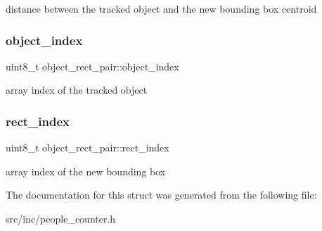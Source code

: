 distance between the tracked object and the new bounding box centroid \mbox{\label{structobject__rect__pair_a6e1fad724b69c75cb7702a545c1b8715}} 
\subsubsection{\texorpdfstring{object\_index}{object\_index}}
{\footnotesize\ttfamily uint8\+\_\+t object\+\_\+rect\+\_\+pair\+::object\+\_\+index}

array index of the tracked object \mbox{\label{structobject__rect__pair_ac89984c58c0f4309ff2a5cb75a6bc18a}} 
\subsubsection{\texorpdfstring{rect\_index}{rect\_index}}
{\footnotesize\ttfamily uint8\+\_\+t object\+\_\+rect\+\_\+pair\+::rect\+\_\+index}

array index of the new bounding box 

The documentation for this struct was generated from the following file\+:\begin{DoxyCompactItemize}
\item 
src/inc/people\+\_\+counter.\+h\end{DoxyCompactItemize}
